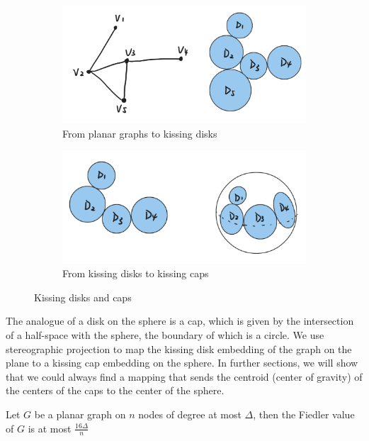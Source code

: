 \begin{figure}[h]
\centering
\begin{subfigure}[b]{0.45\textwidth}
\includegraphics[width=\textwidth]{figures/kissingdisk.png}
\caption{From planar graphs to kissing disks}
\label{fig:kissing-disks}
\end{subfigure}
\hfill
\begin{subfigure}[b]{0.45\textwidth}
\includegraphics[width=\textwidth]{figures/kissingcaps.png}
\caption{From kissing disks to kissing caps}
\label{fig:kissing-caps}
\end{subfigure}
\caption{Kissing disks and caps}
\label{fig:kissing-disks-caps}
\end{figure}

The analogue of a disk on the sphere is a cap, which is given by the intersection of a half-space with the sphere, the boundary of which is a circle. We use stereographic projection to map the kissing disk embedding of the graph on the plane to a kissing cap embedding on the sphere. In further sections, we will show that we could always find a mapping that sends the centroid (center of gravity) of the centers of the caps to the center of the sphere.

\begin{theorem}
Let $G$ be a planar graph on $n$ nodes of degree at most $\Delta$, then the Fiedler value of $G$ is at most $\frac{16\Delta}{n}$
\end{theorem}

